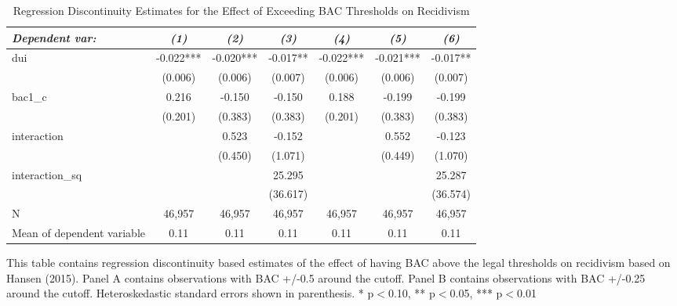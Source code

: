 \begin{table}[htbp]\centering
\small
\caption{Regression Discontinuity Estimates for the Effect of Exceeding BAC Thresholds on Recidivism}
\begin{center}
\begin{threeparttable}
\begin{tabular}{l*{6}{c}}
\toprule
\multicolumn{1}{l}{\textit{Dependent var: }}&
\multicolumn{1}{c}{\textit{(1)}}&
\multicolumn{1}{c}{\textit{(2)}}&
\multicolumn{1}{c}{\textit{(3)}}&
\multicolumn{1}{c}{\textit{(4)}}&
\multicolumn{1}{c}{\textit{(5)}}&
\multicolumn{1}{c}{\textit{(6)}}\\
\midrule
dui                 &      -0.022***&      -0.020***&      -0.017** &      -0.022***&      -0.021***&      -0.017** \\
                    &     (0.006)   &     (0.006)   &     (0.007)   &     (0.006)   &     (0.006)   &     (0.007)   \\
bac1\_c              &       0.216   &      -0.150   &      -0.150   &       0.188   &      -0.199   &      -0.199   \\
                    &     (0.201)   &     (0.383)   &     (0.383)   &     (0.201)   &     (0.383)   &     (0.383)   \\
interaction         &               &       0.523   &      -0.152   &               &       0.552   &      -0.123   \\
                    &               &     (0.450)   &     (1.071)   &               &     (0.449)   &     (1.070)   \\
interaction\_sq      &               &               &      25.295   &               &               &      25.287   \\
                    &               &               &    (36.617)   &               &               &    (36.574)   \\
\midrule
N                   &      46,957   &      46,957   &      46,957   &      46,957   &      46,957   &      46,957   \\
Mean of dependent variable&        0.11   &        0.11   &        0.11   &        0.11   &        0.11   &        0.11   \\
\bottomrule
\end{tabular}
\begin{tablenotes}
\tiny
\item This table contains regression discontinuity based estimates of the effect of having BAC above the legal thresholds on recidivism based on Hansen (2015). Panel A contains observations with BAC +/-0.5 around the cutoff. Panel B contains observations with BAC +/-0.25 around the cutoff. Heteroskedastic standard errors shown in parenthesis.  * p$<$0.10, ** p$<$0.05, *** p$<$0.01
\end{tablenotes}
\end{threeparttable}
\end{center}
\end{table}
